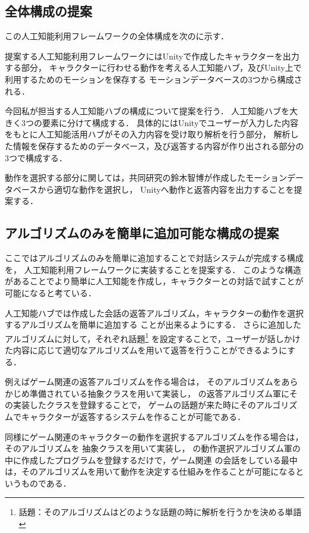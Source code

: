 \subsection{全体構成の提案}\label{sec:allAr}
この人工知能利用フレームワークの全体構成を次のに示す．


提案する人工知能利用フレームワークにはUnityで作成したキャラクターを出力する部分，
キャラクターに行わせる動作を考える人工知能ハブ，及びUnity上で利用するためのモーションを保存する
モーションデータベースの3つから構成される．

今回私が担当する人工知能ハブの構成について提案を行う．
人工知能ハブを大きく3つの要素に分けて構成する．
具体的にはUnityでユーザーが入力した内容をもとに人工知能活用ハブがその入力内容を受け取り解析を行う部分，
解析した情報を保存するためのデータベース，及び返答する内容が作り出される部分の3つで構成する．

動作を選択する部分に関しては，共同研究の鈴木智博が作成したモーションデータベースから適切な動作を選択し，
Unityへ動作と返答内容を出力することを提案する．

\subsection{アルゴリズムのみを簡単に追加可能な構成の提案}
ここではアルゴリズムのみを簡単に追加することで対話システムが完成する構成を，
人工知能利用フレームワークに実装することを提案する．
このような構造があることでより簡単に人工知能を作成し，キャラクターとの対話で試すことが可能になると考ている．

人工知能ハブでは作成した会話の返答アルゴリズム，キャラクターの動作を選択するアルゴリズムを簡単に追加する
ことが出来るようにする．
さらに追加したアルゴリズムに対して，それぞれ話題\footnote{話題：そのアルゴリズムはどのような話題の時に解析を行うかを決める単語}
を設定することで，ユーザーが話しかけた内容に応じて適切なアルゴリズムを用いて返答を行うことができるようにする．

例えばゲーム関連の返答アルゴリズムを作る場合は，
そのアルゴリズムをあらかじめ準備されている抽象クラスを用いて実装し，
の返答アルゴリズム軍にその実装したクラスを登録することで，
ゲームの話題が来た時にそのアルゴリズムでキャラクターが返答するシステムを作ることが可能である．

同様にゲーム関連のキャラクターの動作を選択するアルゴリズムを作る場合は，そのアルゴリズムを
抽象クラスを用いて実装し，
の動作選択アルゴリズム軍の中に作成したプログラムを登録するだけで，ゲーム関連
の会話をしている最中は，そのアルゴリズムを用いて動作を決定する仕組みを作ることが可能になるというものである．

